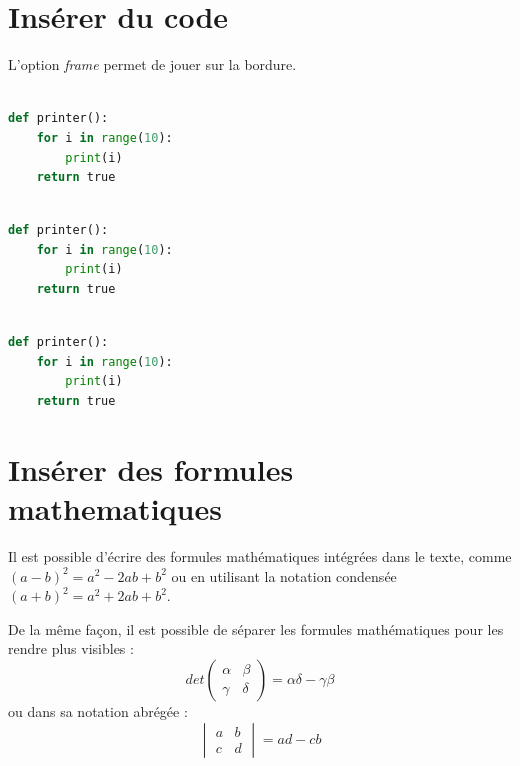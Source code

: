 \section{Insérer du code}
L'option \emph{frame} permet de jouer sur la bordure.
\begin{lstlisting}[language=Python, frame=L, caption={Une imprimante des premiers nombres},label=monImprimante]  % Start your code-block

def printer():
	for i in range(10):
		print(i)
	return true
\end{lstlisting}

\begin{lstlisting}[language=Python, frame=single, caption={Une seconde imprimante des premiers nombres},label=monImprimante2]  % Start your code-block

def printer():
	for i in range(10):
		print(i)
	return true
\end{lstlisting}

\begin{lstlisting}[language=Python, frame=shadowbox, caption={Une troisième imprimante des premiers nombres},label=monImprimante3]  % Start your code-block

def printer():
	for i in range(10):
		print(i)
	return true
\end{lstlisting}


\section{Insérer des formules mathematiques}
Il est possible d'écrire des formules mathématiques intégrées dans le texte, comme \begin{math}(a-b)^2=a^2-2ab+b^2\end{math} ou en utilisant la notation condensée $(a+b)^2=a^2+2ab+b^2$.

De la même façon, il est possible de séparer les formules mathématiques pour les rendre plus visibles :
\begin{displaymath}
	det \begin{pmatrix}
	\alpha & \beta \\
	\gamma & \delta
	\end{pmatrix} = \alpha\delta - \gamma\beta 
\end{displaymath} ou dans sa notation abrégée : 
$$
\begin{vmatrix} 
	a & b \\
	c & d 
\end{vmatrix} = ad - cb
$$


